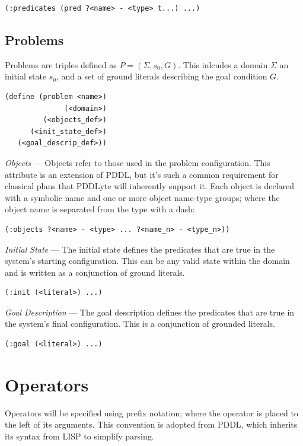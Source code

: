 \documentclass[
a4paper, %
11pt, %
onecolumn, %
openany, %
]{memoir}
\begin{document}
{\begin{lstlisting}
(:predicates (pred ?<name> - <type> t...) ...)
\end{lstlisting}

\subsection{Problems}
Problems are triples defined as $P = (\Sigma, s_0, G)$. This inlcudes a domain $\Sigma$ an initial state $s_0$, and a set of ground literals describing the goal condition $G$.

\begin{lstlisting}
(define (problem <name>)
              (<domain>)
         (<objects_def>)
      (<init_state_def>)
   (<goal_descrip_def>))
\end{lstlisting}

\textit{Objects} --- Objects refer to those used in the problem configuration. This attribute is an extension of PDDL, but it's such a common requirement for classical plans that PDDLyte will inherently support it. Each object is declared with a symbolic name and one or more object name-type groups; where the object name is separated from the type with a dash:


\begin{lstlisting}
(:objects ?<name> - <type> ... ?<name_n> - <type_n>))
\end{lstlisting}

\textit{Initial State} --- The initial state defines the predicates that are true in the system's starting configuration. This can be any valid state within the domain and is written as a conjunction of ground literals.

\begin{lstlisting}
(:init (<literal>) ...)
\end{lstlisting}

\textit{Goal Description} --- The goal description defines the predicates that are true in the system's final configuration. This is a conjunction of grounded literals.

\begin{lstlisting}
(:goal (<literal>) ...)
\end{lstlisting}


\section{Operators}
Operators will be specified using prefix notation; where the operator is placed to the left of its arguments. This convention is adopted from PDDL, which inherits its syntax from LISP to simplify parsing.\\

}
\end{document}
